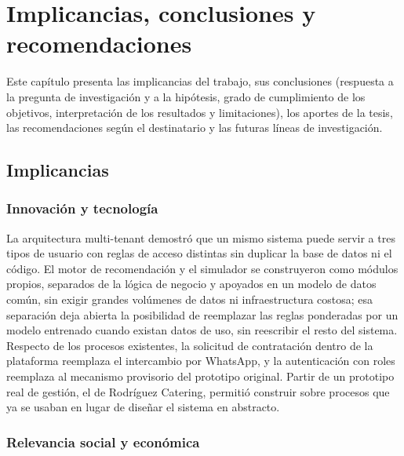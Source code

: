 
\chapter{Implicancias, conclusiones y recomendaciones}\label{cap:conclusiones}

Este capítulo presenta las implicancias del trabajo, sus conclusiones
(respuesta a la pregunta de investigación y a la hipótesis, grado de
cumplimiento de los objetivos, interpretación de los resultados y
limitaciones), los aportes de la tesis, las recomendaciones según el
destinatario y las futuras líneas de investigación.

\section{Implicancias}

\subsection{Innovación y tecnología}

La arquitectura multi-tenant demostró que un mismo sistema puede servir a
tres tipos de usuario con reglas de acceso distintas sin duplicar la base
de datos ni el código. El motor de recomendación y el simulador se
construyeron como módulos propios, separados de la lógica de negocio y
apoyados en un modelo de datos común, sin exigir grandes volúmenes de
datos ni infraestructura costosa; esa separación deja abierta la
posibilidad de reemplazar las reglas ponderadas por un modelo entrenado
cuando existan datos de uso, sin reescribir el resto del sistema.
Respecto de los procesos existentes, la solicitud de contratación dentro
de la plataforma reemplaza el intercambio por WhatsApp, y la
autenticación con roles reemplaza al mecanismo provisorio del prototipo
original. Partir de un prototipo real de gestión, el de Rodríguez
Catering, permitió construir sobre procesos que ya se usaban en lugar de
diseñar el sistema en abstracto.

\subsection{Relevancia social y económica}

